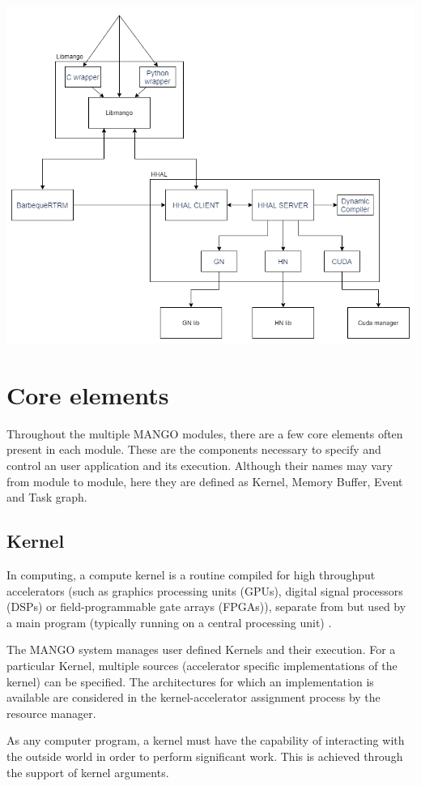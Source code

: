 \includegraphics[scale=0.5]{img/architecture.png}

\section{Core elements}
Throughout the multiple MANGO modules, there are a few core elements often present in each module. These are the components necessary to specify and control an user application and its execution. Although their names may vary from module to module, here they are defined as Kernel, Memory Buffer, Event and Task graph.

\subsection{Kernel}
In computing, a compute kernel is a routine compiled for high throughput accelerators (such as graphics processing units (GPUs), digital signal processors (DSPs) or field-programmable gate arrays (FPGAs)), separate from but used by a main program (typically running on a central processing unit) \cite{kernel_wikipedia}. 

The MANGO system manages user defined Kernels and their execution. For a particular Kernel, multiple sources (accelerator specific implementations of the kernel) can be specified. The architectures for which an implementation is available are considered in the kernel-accelerator assignment process by the resource manager. 

As any computer program, a kernel must have the capability of interacting with the outside world in order to perform significant work. This is achieved through the support of kernel arguments.

